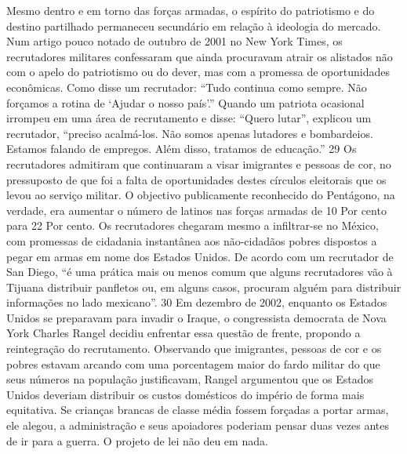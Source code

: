  
\par
 
Mesmo dentro e em torno das forças armadas, o espírito do patriotismo e do destino partilhado permaneceu secundário em relação à ideologia do mercado. Num artigo pouco notado de outubro de 2001 no New York Times, os recrutadores militares confessaram que ainda procuravam atrair os alistados não com o apelo do patriotismo ou do dever, mas com a promessa de oportunidades econômicas. Como disse um recrutador: “Tudo continua como sempre. Não forçamos a rotina de ‘Ajudar o nosso país’.” Quando um patriota ocasional irrompeu em uma área de recrutamento e disse: “Quero lutar”, explicou um recrutador, “preciso acalmá-los. Não somos apenas lutadores e bombardeios. Estamos falando de empregos. Além disso, tratamos de educação.”
 {\color{blue} 29}  
Os recrutadores admitiram que continuaram a visar imigrantes e pessoas de cor, no pressuposto de que foi a falta de oportunidades destes círculos eleitorais que os levou ao serviço militar. O objectivo publicamente reconhecido do Pentágono, na verdade, era aumentar o número de latinos nas forças armadas de
 {\color{blue} 10}  
Por cento para
 {\color{blue} 22}  
Por cento. Os recrutadores chegaram mesmo a infiltrar-se no México, com promessas de cidadania instantânea aos não-cidadãos pobres dispostos a pegar em armas em nome dos Estados Unidos. De acordo com um recrutador de San Diego, “é uma prática mais ou menos comum que alguns recrutadores vão à Tijuana distribuir panfletos ou, em alguns casos, procuram alguém para distribuir informações no lado mexicano”.
 {\color{blue} 30}  
Em dezembro de 2002, enquanto os Estados Unidos se preparavam para invadir o Iraque, o congressista democrata de Nova York Charles Rangel decidiu enfrentar essa questão de frente, propondo a reintegração do recrutamento. Observando que imigrantes, pessoas de cor e os pobres estavam arcando com uma porcentagem maior do fardo militar do que seus números na população justificavam, Rangel argumentou que os Estados Unidos deveriam distribuir os custos domésticos do império de forma mais equitativa. Se crianças brancas de classe média fossem forçadas a portar armas, ele alegou, a administração e seus apoiadores poderiam pensar duas vezes antes de ir para a guerra. O projeto de lei não deu em nada.
 
\par
 
